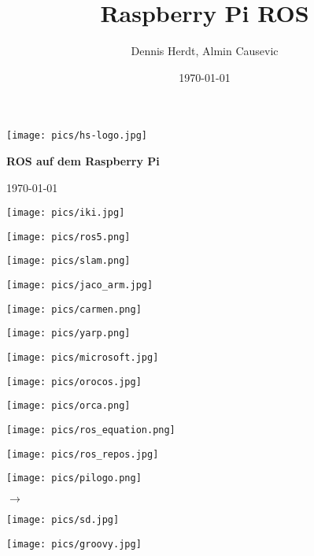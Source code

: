 \documentclass{beamer}
\title[Rapi]{Raspberry Pi ROS}
\author[D. Herdt, A. Causevic]{Dennis Herdt, Almin Causevic}
\institute[I_HS Wgt-Rav]{Informatik HS Weingarten-Ravensburg}
\date{\today}
\begin{document}
\begin{frame}[fragile]

\texttt{[image: pics/hs-logo.jpg]}


\vspace{1cm}

\begin{center}

{\bf \huge ROS auf dem Raspberry Pi}
\vspace{2cm}

\today

\end{center}
\end{frame}

\begin{frame}
\centerline{\texttt{[image: pics/iki.jpg]}}
\end{frame}

\begin{frame}
\centerline{\texttt{[image: pics/ros5.png]}}
\end{frame}

\begin{frame}
\centerline{\texttt{[image: pics/slam.png]}}
\end{frame}

\begin{frame}
\centerline{\texttt{[image: pics/jaco\_arm.jpg]}}
\end{frame}

\begin{frame}
\parbox{5cm}{\texttt{[image: pics/carmen.png]}}
\parbox{5cm}{\texttt{[image: pics/yarp.png]}}
\parbox{5cm}{\texttt{[image: pics/microsoft.jpg]}}
\hspace{5cm}
\parbox{5cm}{\texttt{[image: pics/orocos.jpg]}}
\parbox{5cm}{\texttt{[image: pics/orca.png]}}
\end{frame}

\begin{frame}
\centerline{\texttt{[image: pics/ros\_equation.png]}}
\end{frame}

\begin{frame}
\centerline{\texttt{[image: pics/ros\_repos.jpg]}}
\end{frame}


\begin{frame}
\parbox{5cm}{\texttt{[image: pics/pilogo.png]}}
\huge \hfill 
 $\rightarrow$
\parbox{5cm}{\texttt{[image: pics/sd.jpg]}}
\end{frame}

\begin{frame}
\centerline{\texttt{[image: pics/groovy.jpg]}}
\end{frame}
\end{document}
